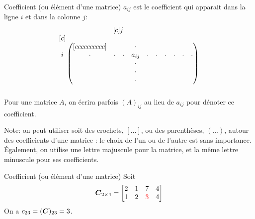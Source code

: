 \documentclass[french]{beamer}
\begin{document}
	\begin{frame}
		\begin{block}{Coefficient (ou élément d'une matrice)}
		$a_{ij}$ est le coefficient qui apparait dans la ligne $i$ et dans la colonne $j$:
\[
\begin{matrix}[c]
j\hspace*{1.1cm} \\
\begin{matrix}[c]\\ \\ i \\ \\ \\ \\ \\ \end{matrix}
\begin{pmatrix}[cccccccccc]
&&&\cdot&&&&&& \\
\cdot&\cdot&\cdot&a_{ij}&\cdot&\cdot&\cdot&\cdot&\cdot&\cdot\\
&&&\cdot&&&&&&\\
&&&\cdot&&&&&&\\
&&&\cdot&&&&&&
\end{pmatrix}
\end{matrix}
\]
		Pour une matrice $A$, on écrira parfois $(A)_{ij}$ au lieu de $a_{ij}$ pour dénoter ce coefficient.
	\end{block}
	Note: on peut utiliser soit des crochets, $[...]$, ou des parenthèses, $(...)$, autour des coefficients d'une matrice : le choix de l'un ou de l'autre est sans importance. Également, on utilise une lettre majuscule pour la matrice, et la même lettre minuscule pour ses coefficients.
	\end{frame}

	\begin{frame}{Coefficient (ou élément d'une matrice)}
	Soit
		\[
\boldsymbol{C}_{2\times4} = \begin{bmatrix}
2 & 1 & 7 & 4\\
1 & 2 & {\color{red}3} & 4
\end{bmatrix} \]
On a $c_{23} = (\boldsymbol{C})_{23} = 3$.
\end{frame}		
\end{document}
